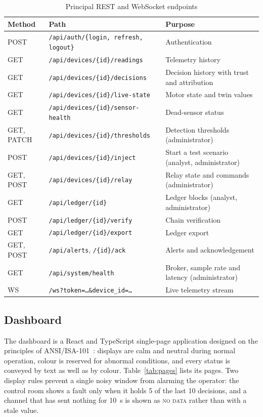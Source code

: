 \begin{table}[htbp]
\centering
\caption{Principal REST and WebSocket endpoints}
\label{tab:api}
\small
\begin{tabularx}{\textwidth}{@{}l l X@{}}
\toprule
\textbf{Method} & \textbf{Path} & \textbf{Purpose} \\
\midrule
POST & \texttt{/api/auth/\{login, refresh, logout\}} & Authentication \\
GET & \texttt{/api/devices/\{id\}/readings} & Telemetry history \\
GET & \texttt{/api/devices/\{id\}/decisions} & Decision history with trust and attribution \\
GET & \texttt{/api/devices/\{id\}/live-state} & Motor state and twin values \\
GET & \texttt{/api/devices/\{id\}/sensor-health} & Dead-sensor status \\
GET, PATCH & \texttt{/api/devices/\{id\}/thresholds} & Detection thresholds (administrator) \\
POST & \texttt{/api/devices/\{id\}/inject} & Start a test scenario (analyst, administrator) \\
GET, POST & \texttt{/api/devices/\{id\}/relay} & Relay state and commands (administrator) \\
GET & \texttt{/api/ledger/\{id\}} & Ledger blocks (analyst, administrator) \\
POST & \texttt{/api/ledger/\{id\}/verify} & Chain verification \\
GET & \texttt{/api/ledger/\{id\}/export} & Ledger export \\
GET, POST & \texttt{/api/alerts}, \texttt{/\{id\}/ack} & Alerts and acknowledgement \\
GET & \texttt{/api/system/health} & Broker, sample rate and latency (administrator) \\
WS & \texttt{/ws?token=\ldots\&device\_id=\ldots} & Live telemetry stream \\
\bottomrule
\end{tabularx}
\end{table}

\subsection{Dashboard}

The dashboard is a React and TypeScript single-page application designed on the principles of ANSI/ISA-101~\cite{isa101}: displays are calm and neutral during normal operation, colour is reserved for abnormal conditions, and every status is conveyed by text as well as by colour. Table~\ref{tab:pages} lists its pages. Two display rules prevent a single noisy window from alarming the operator: the control room shows a fault only when it holds 5 of the last 10 decisions, and a channel that has sent nothing for 10~s is shown as \textsc{no data} rather than with a stale value.

